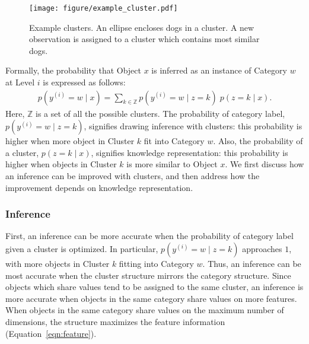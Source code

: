 \documentclass[doc]{apa6}
\begin{document}
\begin{figure}
    \centering

    \texttt{[image: figure/example\_cluster.pdf]}
    \vspace{6pt}

    \caption{Example clusters. An ellipse encloses dogs in a cluster. A new observation is assigned
    to a cluster which contains most similar dogs.}

\label{fig:cluster}
\end{figure}

Formally, the probability that Object $x$ is inferred as an instance of Category $w$ at Level $i$ is
expressed as follows:
\begin{align}
    p(y^{(i)} = w\; \vert \; x) = \sum_{k \in \mathbb{Z}}
    p(y^{(i)} = w \; \vert \; z = k)
    \;
    p(z = k \; \vert \; x).
\end{align}
Here, $\mathbb{Z}$ is a set of all the possible clusters. The probability of category label,
$p(y^{(i)} = w \; \vert \; z = k)$, signifies drawing inference with clusters: this probability is
higher when more object in Cluster $k$ fit into Category $w$. Also, the probability of a cluster,
$p(z = k \; \vert \; x)$, signifies knowledge representation: this probability is higher when
objects in Cluster $k$ is more similar to Object $x$. We first discuss how an inference can be
improved with clusters, and then address how the improvement depends on knowledge representation.

\subsubsection*{Inference}


First, an inference can be more accurate when the probability of category label given a cluster is
optimized. In particular, $p(y^{(i)} = w \; \vert \; z = k)$ approaches $1$, with more objects in
Cluster $k$ fitting into Category $w$. Thus, an inference can be most accurate when the cluster
structure mirrors the category structure. Since objects which share values tend to be assigned to
the same cluster, an inference is more accurate when objects in the same category share values on
more features. When objects in the same category share values on the maximum number of dimensions,
the structure maximizes the feature information (Equation~\ref{eqn:feature}).
\end{document}
